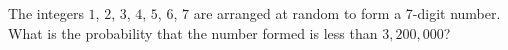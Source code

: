 The integers $1$, $2$, $3$, $4$, $5$, $6$, $7$ are arranged at random to form a 7-digit number. What is the probability that the number formed is less than $3,200,000$?
